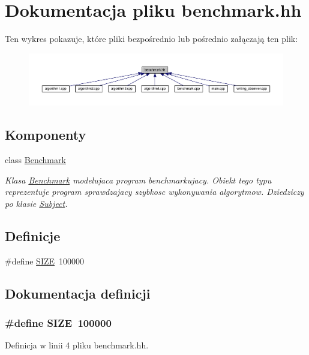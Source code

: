 \hypertarget{benchmark_8hh}{\section{Dokumentacja pliku benchmark.\-hh}
\label{benchmark_8hh}
}
Ten wykres pokazuje, które pliki bezpośrednio lub pośrednio załączają ten plik\-:\nopagebreak
\begin{figure}[H]
\begin{center}
\leavevmode
\includegraphics[width=350pt]{benchmark_8hh__dep__incl}
\end{center}
\end{figure}
\subsection*{Komponenty}
\begin{DoxyCompactItemize}
\item 
class \hyperlink{class_benchmark}{Benchmark}
\begin{DoxyCompactList}\small\item\em Klasa \hyperlink{class_benchmark}{Benchmark} modelujaca program benchmarkujacy. Obiekt tego typu reprezentuje program sprawdzajacy szybkosc wykonywania algorytmow. Dziedziczy po klasie \hyperlink{class_subject}{Subject}. \end{DoxyCompactList}\end{DoxyCompactItemize}
\subsection*{Definicje}
\begin{DoxyCompactItemize}
\item 
\#define \hyperlink{benchmark_8hh_a70ed59adcb4159ac551058053e649640}{S\-I\-Z\-E}~100000
\end{DoxyCompactItemize}


\subsection{Dokumentacja definicji}
\hypertarget{benchmark_8hh_a70ed59adcb4159ac551058053e649640}{
\subsubsection[{S\-I\-Z\-E}]{\setlength{\rightskip}{0pt plus 5cm}\#define S\-I\-Z\-E~100000}}\label{benchmark_8hh_a70ed59adcb4159ac551058053e649640}


Definicja w linii 4 pliku benchmark.\-hh.

